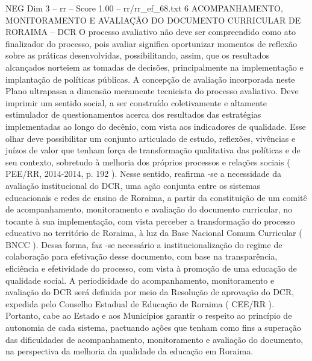 \begin{textsample}{NEG Dim 3 – rr – Score 1.00 – rr/rr\_ef\_68.txt}  \label{ex:f3_neg_069}
6 ACOMPANHAMENTO, MONITORAMENTO E AVALIAÇÃO DO DOCUMENTO CURRICULAR DE RORAIMA – DCR O processo avaliativo não deve ser compreendido como ato finalizador do processo, pois avaliar significa oportunizar momentos de reflexão sobre as práticas desenvolvidas, possibilitando, assim, que os resultados alcançados norteiem as tomadas de decisões, principalmente na implementação e implantação de políticas públicas.
A concepção de avaliação incorporada neste Plano ultrapassa a dimensão meramente tecnicista do processo avaliativo.
Deve imprimir um sentido social, a ser construído coletivamente e altamente estimulador de questionamentos acerca dos resultados das estratégias implementadas ao longo do decênio, com vista aos indicadores de qualidade.
Esse olhar deve possibilitar um conjunto articulado de estudo, reflexões, vivências e juízos de valor que tenham força de transformação qualitativa das políticas e de seu contexto, sobretudo à melhoria dos próprios processos e relações sociais ( PEE/RR, 2014-2014, p. 192 ).
Nesse sentido, reafirma -se a necessidade da avaliação institucional do DCR, uma ação conjunta entre os sistemas educacionais e redes de ensino de Roraima, a partir da constituição de um comitê de acompanhamento, monitoramento e avaliação do documento curricular, no tocante à sua implementação, com vista perceber a transformação do processo educativo no território de Roraima, à luz da Base Nacional Comum Curricular ( BNCC ).
Dessa forma, faz -se necessário a institucionalização do regime de colaboração para efetivação desse documento, com base na transparência, eficiência e efetividade do processo, com vista à promoção de uma educação de qualidade social.
A periodicidade do acompanhamento, monitoramento e avaliação do DCR será definida por meio da Resolução de aprovação do DCR, expedida pelo Conselho Estadual de Educação de Roraima ( CEE/RR ).
Portanto, cabe ao Estado e aos Municípios garantir o respeito ao princípio de autonomia de cada sistema, pactuando ações que tenham como fins a superação das dificuldades de acompanhamento, monitoramento e avaliação do documento, na perspectiva da melhoria da qualidade da educação em Roraima.

\end{textsample}

